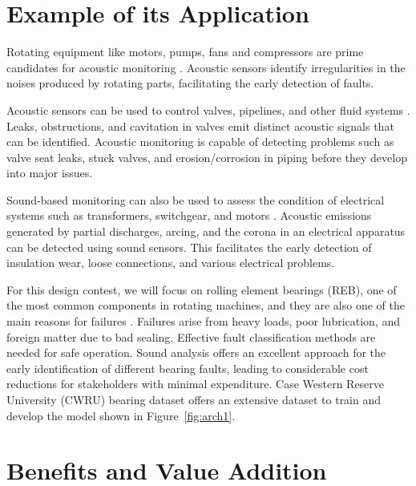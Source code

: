 \documentclass[12pt]{article}
\begin{document}
\section{Example of its Application}
Rotating equipment like motors, pumps, fans and compressors are prime candidates for acoustic monitoring \cite{judith2017}. Acoustic sensors identify irregularities in the noises produced by rotating parts, facilitating the early detection of faults.

Acoustic sensors can be used to control valves, pipelines, and other fluid systems \cite{judith2017}. Leaks, obstructions, and cavitation in valves emit distinct acoustic signals that can be identified. Acoustic monitoring is capable of detecting problems such as valve seat leaks, stuck valves, and erosion/corrosion in piping before they develop into major issues.

Sound-based monitoring can also be used to assess the condition of electrical systems such as transformers, switchgear, and motors \cite{avinton2023}. Acoustic emissions generated by partial discharges, arcing, and the corona in an electrical apparatus can be detected using sound sensors. This facilitates the early detection of insulation wear, loose connections, and various electrical problems.

For this design contest, we will focus on rolling element bearings (REB), one of the most common components in rotating machines, and they are also one of the main reasons for failures \cite{jiang2019bearing}. 
Failures arise from heavy loads, poor lubrication, and foreign matter due to bad sealing. Effective fault classification methods are needed for safe operation. Sound analysis offers an excellent approach for the early identification of different bearing faults, leading to considerable cost reductions for stakeholders with minimal expenditure. Case Western Reserve University (CWRU) bearing dataset \cite{case2019} offers an extensive dataset to train and develop the model shown in Figure~\ref{fig:arch1}. 

\section{Benefits and Value Addition}
\end{document}
